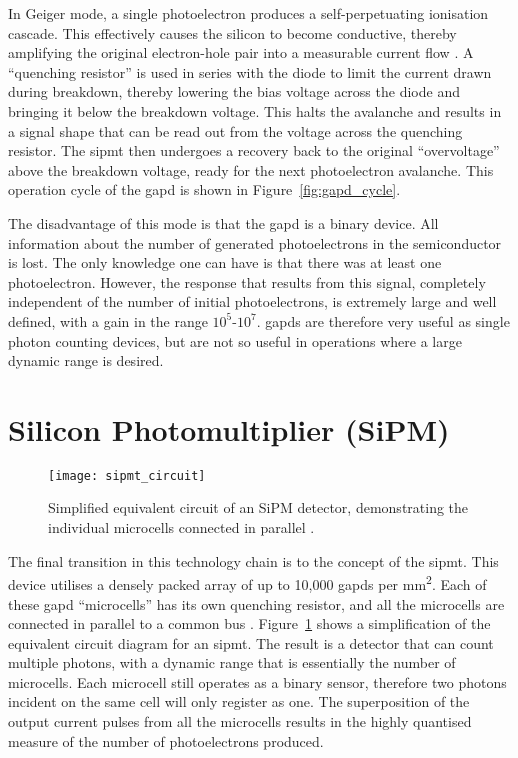 In Geiger mode, a single photoelectron produces a self-perpetuating ionisation cascade. This effectively causes the silicon to become conductive, thereby amplifying the original electron-hole pair into a measurable current flow \cite{SensL2011}. A ``quenching resistor'' is used in series with the diode to limit the current drawn during breakdown, thereby lowering the bias voltage across the diode and bringing it below the breakdown voltage. This halts the avalanche and results in a signal shape that can be read out from the voltage across the quenching resistor. The \gls{sipmt} then undergoes a recovery back to the original ``overvoltage'' above the breakdown voltage, ready for the next photoelectron avalanche. This operation cycle of the \gls{gapd} is shown in Figure~\ref{fig:gapd_cycle}.

The disadvantage of this mode is that the \gls{gapd} is a binary device. All information about the number of generated photoelectrons in the semiconductor is lost. The only knowledge one can have is that there was at least one photoelectron. However, the response that results from this signal, completely independent of the number of initial photoelectrons, is extremely large and well defined, with a gain in the range $10^5$-$10^7$. \glspl{gapd} are therefore very useful as single photon counting devices, but are not so useful in operations where a large dynamic range is desired. 

\section{Silicon Photomultiplier (SiPM)}

\begin{figure}
	\centering
    \texttt{[image: sipmt\_circuit]} 
	\caption[Simplified equivalent circuit of an SiPM detector.]{Simplified equivalent circuit of an SiPM detector, demonstrating the individual microcells connected in parallel \cite{Marano2014}.}
	\label{fig:sipmt_circuit}
\end{figure}

The final transition in this technology chain is to the concept of the \gls{sipmt}. This device utilises a densely packed array of up to 10,000 \glspl{gapd} per \si{mm\squared}. Each of these \gls{gapd} ``microcells'' has its own quenching resistor, and all the microcells are connected in parallel to a common bus \cite{Otte2006}. Figure~\ref{fig:sipmt_circuit} shows a simplification of the equivalent circuit diagram for an \gls{sipmt}. The result is a detector that can count multiple photons, with a dynamic range that is essentially the number of microcells. Each microcell still operates as a binary sensor, therefore two photons incident on the same cell will only register as one. The superposition of the output current pulses from all the microcells results in the highly quantised measure of the number of photoelectrons produced.